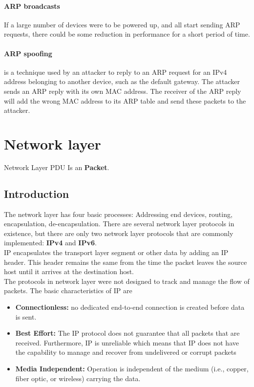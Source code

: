 {\paragraph{ARP broadcasts}  If a large number of devices were to be powered up, and all start sending ARP requests, there could be some reduction in performance for a short period of time. 

\paragraph{ARP spoofing} is a technique used by an attacker to reply to an ARP request for an IPv4 address belonging to another device, such as the default gateway. The attacker sends an ARP reply with its own MAC address. The receiver of the ARP reply will add the wrong MAC address to its ARP table and send these packets to the attacker.

\section{Network layer}

Network Layer PDU Is an \textbf{Packet}.

\subsection{Introduction}

The network layer has four basic processes: Addressing end devices, routing, encapsulation, de-encapsulation. There are several network layer protocols in existence, but there are only two network layer protocols that are commonly implemented: \textbf{IPv4} and \textbf{IPv6}.\\

IP encapsulates the transport layer segment or other data by adding an IP header. This header remains the same from the time the packet leaves the source host until it arrives at the destination host.\\

The protocols in network layer were not designed to track and manage the flow of packets. The basic characteristics of IP are

\begin{itemize}
\item \textbf{Connectionless:} no dedicated end-to-end connection is created before data is sent. 
\item \textbf{Best Effort:} The IP protocol does not guarantee that all packets that are received. Furthermore, IP is unreliable which means that IP does not have the capability to manage and recover from undelivered or corrupt packets
\item \textbf{Media Independent:} Operation is independent of the medium (i.e., copper, fiber optic, or wireless) carrying the data.
\end{itemize}

}
